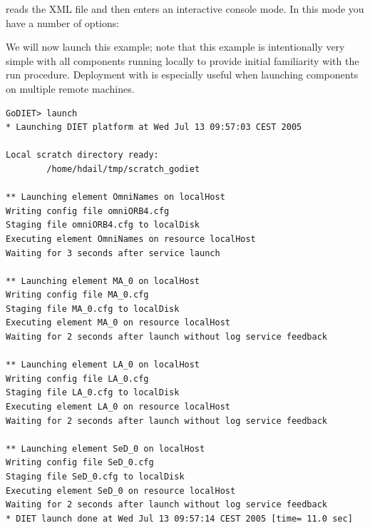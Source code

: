 \godiet reads the XML file and then enters an interactive console mode. In this
mode you have a number of options:


We will now launch this example; note that this example is intentionally very
simple with all components running locally to provide initial familiarity with
the \godiet run procedure. Deployment with \godiet is especially useful  when
launching components on multiple remote machines.

\begin{verbatim}
GoDIET> launch
* Launching DIET platform at Wed Jul 13 09:57:03 CEST 2005

Local scratch directory ready:
        /home/hdail/tmp/scratch_godiet

** Launching element OmniNames on localHost
Writing config file omniORB4.cfg
Staging file omniORB4.cfg to localDisk
Executing element OmniNames on resource localHost
Waiting for 3 seconds after service launch

** Launching element MA_0 on localHost
Writing config file MA_0.cfg
Staging file MA_0.cfg to localDisk
Executing element MA_0 on resource localHost
Waiting for 2 seconds after launch without log service feedback

** Launching element LA_0 on localHost
Writing config file LA_0.cfg
Staging file LA_0.cfg to localDisk
Executing element LA_0 on resource localHost
Waiting for 2 seconds after launch without log service feedback

** Launching element SeD_0 on localHost
Writing config file SeD_0.cfg
Staging file SeD_0.cfg to localDisk
Executing element SeD_0 on resource localHost
Waiting for 2 seconds after launch without log service feedback
* DIET launch done at Wed Jul 13 09:57:14 CEST 2005 [time= 11.0 sec]
\end{verbatim}


